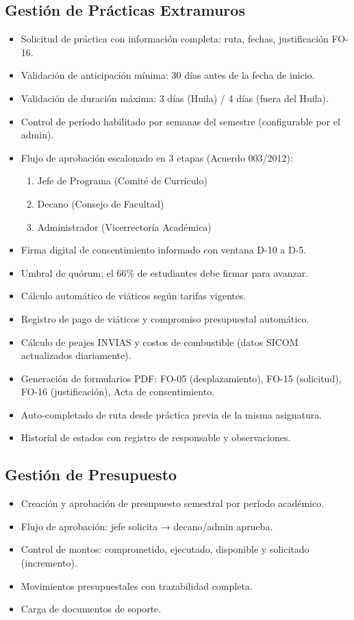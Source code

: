 \documentclass[12pt,a4paper]{article}
\begin{document}
\subsection{Gestión de Prácticas Extramuros}
\begin{itemize}[leftmargin=1.5cm]
  \item Solicitud de práctica con información completa: ruta, fechas, justificación FO-16.
  \item Validación de anticipación mínima: 30 días antes de la fecha de inicio.
  \item Validación de duración máxima: 3 días (Huila) / 4 días (fuera del Huila).
  \item Control de período habilitado por semanas del semestre (configurable por el admin).
  \item Flujo de aprobación escalonado en 3 etapas (Acuerdo 003/2012):
    \begin{enumerate}
      \item Jefe de Programa (Comité de Currículo)
      \item Decano (Consejo de Facultad)
      \item Administrador (Vicerrectoría Académica)
    \end{enumerate}
  \item Firma digital de consentimiento informado con ventana D-10 a D-5.
  \item Umbral de quórum: el 66\% de estudiantes debe firmar para avanzar.
  \item Cálculo automático de viáticos según tarifas vigentes.
  \item Registro de pago de viáticos y compromiso presupuestal automático.
  \item Cálculo de peajes INVIAS y costos de combustible (datos SICOM actualizados diariamente).
  \item Generación de formularios PDF: FO-05 (desplazamiento), FO-15 (solicitud), FO-16 (justificación), Acta de consentimiento.
  \item Auto-completado de ruta desde práctica previa de la misma asignatura.
  \item Historial de estados con registro de responsable y observaciones.
\end{itemize}

\subsection{Gestión de Presupuesto}
\begin{itemize}[leftmargin=1.5cm]
  \item Creación y aprobación de presupuesto semestral por período académico.
  \item Flujo de aprobación: jefe solicita → decano/admin aprueba.
  \item Control de montos: comprometido, ejecutado, disponible y solicitado (incremento).
  \item Movimientos presupuestales con trazabilidad completa.
  \item Carga de documentos de soporte.
\end{itemize}
\end{document}
